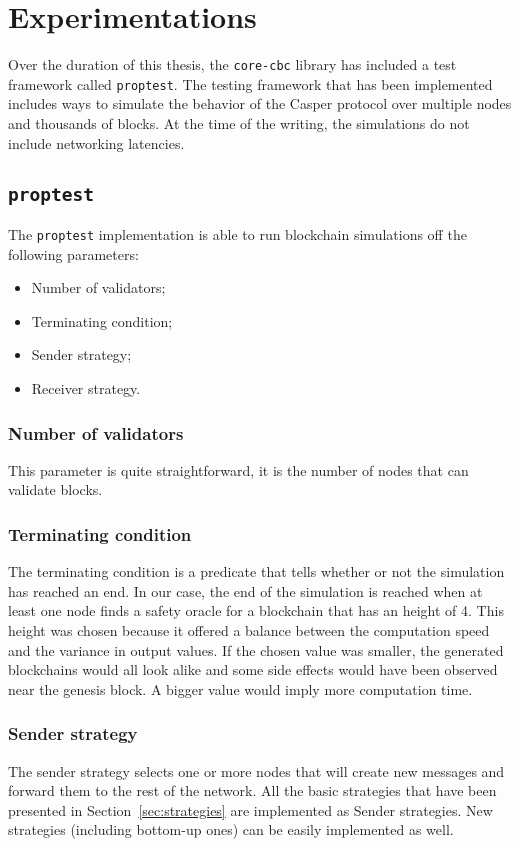 \section{Experimentations}
Over the duration of this thesis, the \texttt{core-cbc} library has included a
test framework called \texttt{proptest}. The testing framework that has been
implemented includes ways to simulate the behavior of the Casper protocol over
multiple nodes and thousands  of blocks. At the time of the
writing, the simulations do not include networking latencies.

\subsection{\texttt{proptest}}
The \texttt{proptest} implementation is able to run blockchain simulations off
the following parameters:
\begin{itemize}
    \item Number of validators;
    \item Terminating condition;
    \item Sender strategy;
    \item Receiver strategy.
\end{itemize}

\subsubsection{Number of validators}
This parameter is quite straightforward, it is the number of nodes that can
validate blocks.

\subsubsection{Terminating condition}
The terminating condition is a predicate that tells whether or not the simulation has
reached an end. In our case, the end of the simulation is reached when at least
one node finds a safety oracle for a blockchain that has an height of 4. This
height was chosen because it offered a balance between the computation speed and
the variance in output values. If the chosen value was smaller, the generated
blockchains would all look alike and some side effects would have been observed
near the genesis block. A bigger value would imply more computation time.

\subsubsection{Sender strategy}
The sender strategy selects one or more nodes that will create new messages and
forward them to the rest of the network. All the basic strategies that have been
presented in Section~\ref{sec:strategies} are implemented as Sender strategies.
New strategies (including bottom-up ones) can be easily implemented as well.

